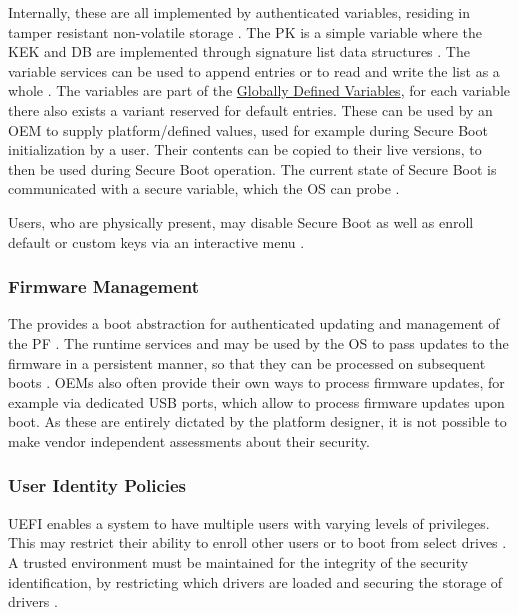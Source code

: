 Internally, these are all implemented by authenticated variables, residing in tamper resistant non-volatile storage \cite[Section 32.3]{uefi-spec}.
The \ac{PK} is a simple variable where the \ac{KEK} and \ac{DB} are implemented through signature list data structures \cite[Section 32.4.1]{uefi-spec}.
The variable services can be used to append entries or to read and write the list as a whole \cite[Sections 32.3.5 and 32.5.3]{uefi-spec}.
The variables are part of the \hyperref[sec:uefi-pi:uefi:variables]{Globally Defined Variables}, for each variable there also exists a variant reserved for default entries.
These can be used by an \ac{OEM} to supply platform\-/defined values, used for example during Secure Boot initialization by a user.
Their contents can be copied to their live versions, to then be used during Secure Boot operation.
The current state of Secure Boot is communicated with a secure variable, which the \ac{OS} can probe \cite[Section 3.3]{uefi-spec}.

Users, who are physically present, may disable Secure Boot as well as enroll default or custom keys via an interactive menu \cite[Section 3.3]{uefi-spec}.

\subsubsection{Firmware Management}

The  provides a boot abstraction for authenticated updating and management of the \ac{PF} \cite[Section 23]{uefi-spec}.
The runtime services  and  may be used by the \ac{OS} to pass updates to the firmware in a persistent manner, so that they can be processed on subsequent boots \cite[Section 23.3]{uefi-spec}.
\acp{OEM} also often provide their own ways to process firmware updates, for example via dedicated \ac{USB} ports, which allow to process firmware updates upon boot.
As these are entirely dictated by the platform designer, it is not possible to make vendor independent assessments about their security.

\subsubsection{User Identity Policies}

\ac{UEFI} enables a system to have multiple users with varying levels of privileges.
This may restrict their ability to enroll other users or to boot from select drives \cite[Section 36.1.2]{uefi-spec}.
A trusted environment must be maintained for the integrity of the security identification, by restricting which drivers are loaded and securing the storage of drivers \cite[Section 36.1.4]{uefi-spec}.